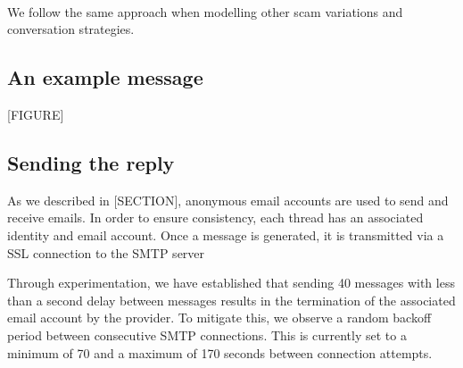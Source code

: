 \begin{figure}
  ~ %
\end{figure}

We follow the same approach when modelling other scam variations and conversation strategies.

\subsection{An example message}

[FIGURE]

\subsection{Sending the reply}
As we described in [SECTION], anonymous email accounts are used to send and receive emails. In order to ensure consistency, each thread has an associated identity and email account. Once a message is generated, it is transmitted via a SSL connection to the SMTP server

Through experimentation, we have established that sending 40 messages with less than a second delay between messages results in the termination of the associated email account by the provider. To mitigate this, we observe a random backoff period between consecutive SMTP connections. This is currently set to a minimum of 70 and a maximum of 170 seconds between connection attempts.